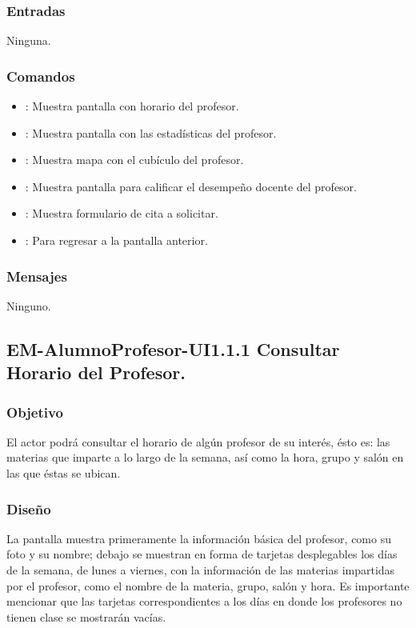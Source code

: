 \subsubsection{Entradas}
	\noindent
	Ninguna.

\subsubsection{Comandos}
\begin{itemize}
	\item {}: Muestra pantalla con horario del profesor.
	\item {}: Muestra pantalla con las estadísticas del profesor.
	\item {}: Muestra mapa con el cubículo del profesor.
	\item {}: Muestra pantalla para calificar el desempeño docente del profesor.
	\item {}: Muestra formulario de cita a solicitar.
	\item {}: Para regresar a la pantalla anterior.
\end{itemize}

\subsubsection{Mensajes}
	\noindent
	Ninguno.


\pagebreak
\subsection{EM-AlumnoProfesor-UI1.1.1 Consultar Horario del Profesor.}

\subsubsection{Objetivo}
	\noindent
	El actor podrá consultar el horario de algún profesor de su interés, ésto es: las materias que imparte a lo largo de la semana, así como la hora, grupo y salón en las que éstas se ubican.

\subsubsection{Diseño}
	\noindent
	La pantalla muestra primeramente la información básica del profesor, como su foto y su nombre; debajo se muestran en forma de tarjetas desplegables los días de la semana, de lunes a viernes, con la información de las materias impartidas por el profesor, como el nombre de la materia, grupo, salón y hora. Es importante mencionar que las tarjetas correspondientes a los días en donde los profesores no tienen clase se mostrarán vacías.


